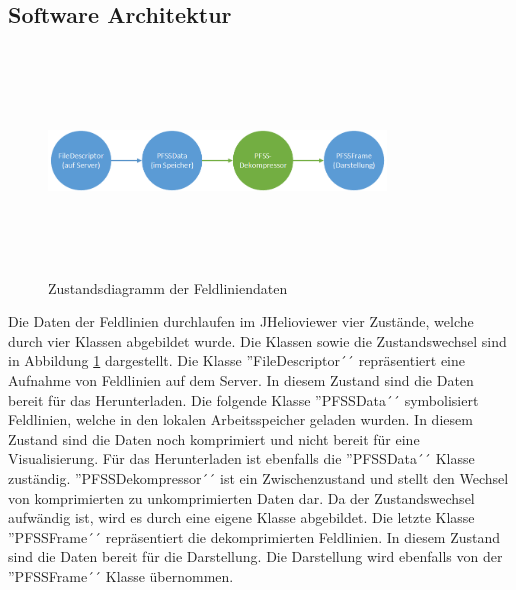 \subsection{Software Architektur}
\begin{figure}[!htbp]
	\center
	\includegraphics[width=0.8\textwidth,height=6cm,keepaspectratio]{./pictures/implementation/dataflow.png}
	\caption{Zustandsdiagramm der Feldliniendaten}
	\label{implementation:architektur:datenfluss}
\end{figure}
Die Daten der Feldlinien durchlaufen im JHelioviewer vier Zustände, welche durch vier Klassen abgebildet wurde. Die Klassen sowie die Zustandswechsel sind in Abbildung \ref{implementation:architektur:datenfluss} dargestellt. Die Klasse ''FileDescriptor´´ repräsentiert eine Aufnahme von Feldlinien auf dem Server. In diesem Zustand sind die Daten bereit für das Herunterladen. Die folgende Klasse ''PFSSData´´ symbolisiert Feldlinien, welche in den lokalen Arbeitsspeicher geladen wurden. In diesem Zustand sind die Daten noch komprimiert und nicht bereit für eine Visualisierung. Für das Herunterladen ist ebenfalls die ''PFSSData´´ Klasse zuständig. ''PFSSDekompressor´´ ist ein Zwischenzustand und stellt den Wechsel von komprimierten zu unkomprimierten Daten dar. Da der Zustandswechsel aufwändig ist, wird es durch eine eigene Klasse abgebildet. Die letzte Klasse ''PFSSFrame´´ repräsentiert die dekomprimierten Feldlinien. In diesem Zustand sind die Daten bereit für die Darstellung. Die Darstellung wird ebenfalls von der ''PFSSFrame´´ Klasse übernommen.

